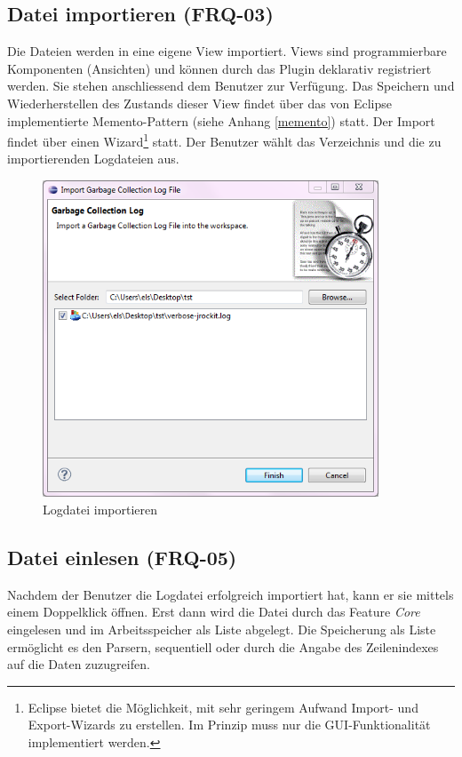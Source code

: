 \subsection{Datei importieren (FRQ-03)}
Die Dateien werden in eine eigene View importiert. Views sind programmierbare Komponenten (Ansichten) und können durch das Plugin deklarativ registriert werden. Sie stehen anschliessend dem Benutzer zur Verfügung. Das Speichern und Wiederherstellen des Zustands dieser View findet über das von Eclipse implementierte Memento-Pattern (siehe Anhang \ref{memento}) statt. Der Import findet über einen Wizard\footnote{Eclipse bietet die Möglichkeit, mit sehr geringem Aufwand Import- und Export-Wizards zu erstellen. Im Prinzip muss nur die GUI-Funktionalität implementiert werden.} statt. Der Benutzer wählt das Verzeichnis und die zu importierenden Logdateien aus. \begin{figure}[H]
  	\centering
    	\includegraphics[width=10cm]{images/tutorial_importlog}
        	\caption{Logdatei importieren}
\end{figure}

\subsection{Datei einlesen (FRQ-05)}
Nachdem der Benutzer die Logdatei erfolgreich importiert hat, kann er sie mittels einem Doppelklick öffnen. Erst dann wird die Datei durch das Feature \textit{Core} eingelesen und im Arbeitsspeicher als Liste abgelegt. Die Speicherung als Liste ermöglicht es den Parsern, sequentiell oder durch die Angabe des Zeilenindexes auf die Daten zuzugreifen.

